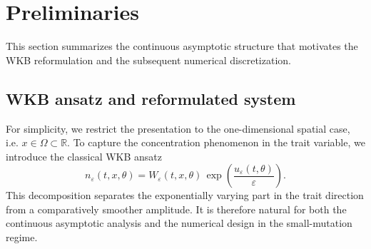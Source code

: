 \documentclass[11pt]{article}
\numberwithin{equation}{section}
\begin{document}
\section{Preliminaries}\label{sec:proliminary}
This section summarizes the continuous asymptotic structure that motivates the WKB reformulation and the subsequent numerical discretization.
\subsection{WKB ansatz and reformulated system}
For simplicity, we restrict the presentation to the one-dimensional spatial case, i.e. $x\in\Omega\subset\mathbb{R}$. 
To capture the concentration phenomenon in the trait variable, we introduce the classical WKB ansatz
\begin{equation}\label{eq:WKB}
   n_\varepsilon(t, x,\theta)
   = W_\varepsilon(t, x,\theta)\,
   \exp\!\left(\frac{u_\varepsilon(t,\theta)}{\varepsilon}\right).
\end{equation}
This decomposition separates the exponentially varying part in the trait direction from a comparatively smoother amplitude. It is therefore natural for both the continuous asymptotic analysis and the numerical design in the small-mutation regime.
\end{document}
